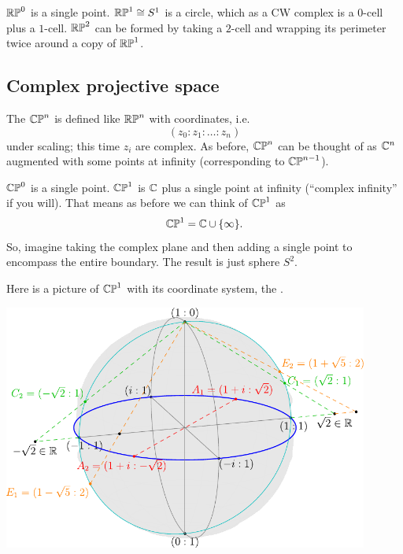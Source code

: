 \begin{example}
	\listhack
	\begin{enumerate}[(a)]
		\ii $\mathbb{RP}^0$ is a single point.
		\ii $\mathbb{RP}^1 \cong S^1$ is a circle, which as a CW complex
		is a $0$-cell plus a $1$-cell.
		\ii $\mathbb{RP}^2$ can be formed by taking a $2$-cell
		and wrapping its perimeter twice around a copy of $\mathbb{RP}^1$.
	\end{enumerate}
\end{example}

\subsection*{Complex projective space}
The  $\mathbb{CP}^n$ is
defined like $\mathbb{RP}^n$ with coordinates, i.e.\
\[ (z_0 : z_1 : \dots : z_n) \]
under scaling; this time $z_i$ are complex.
As before, $\mathbb{CP}^n$ can be thought of as $\mathbb C^n$ augmented
with some points at infinity (corresponding to $\mathbb{CP}^{n-1}$).
\begin{example}
	\listhack
	\begin{enumerate}[(a)]
		\ii $\mathbb{CP}^0$ is a single point.
		\ii $\mathbb{CP}^1$ is $\mathbb C$ plus a single point at infinity
		(``complex infinity'' if you will).
		That means as before we can think of $\mathbb{CP}^1$ as
		\[ \mathbb{CP}^1 = \mathbb C \cup \{\infty\}. \]
		So, imagine taking the complex plane and then adding
		a single point to encompass the entire boundary.
		The result is just sphere $S^2$.
	\end{enumerate}
	Here is a picture of $\mathbb{CP}^1$ with its coordinate system,
	the .
	\begin{center}
		\includegraphics[width=0.9\textwidth]{media/earth.pdf}
	\end{center}
\end{example}


